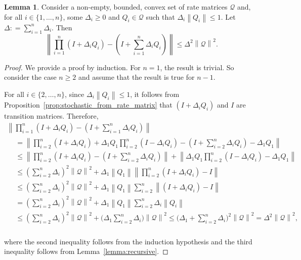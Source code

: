\documentclass[10pt,a4paper]{paper}
\theoremstyle{definition}
\newtheorem{lemma}[theorem]{Lemma}
\newcommand{\rateset}{\mathcal{Q}}
\newcommand{\norm}[1]{\left\lVert #1 \right\rVert}
\newcommand{\coloneqq}{:\!=}
\begin{document}
\begin{lemma}\label{lemma:convex_rate_set_contains_approximation}
Consider a non-empty, bounded, convex set of rate matrices $\rateset$ and, for all $i\in\{1,\ldots,n\}$, some $\Delta_i\geq0$ and $Q_i\in\rateset$ such that $\Delta_i\norm{Q_i}\leq1$. Let $\Delta\coloneqq\sum_{i=1}^n\Delta_i$. Then
\begin{equation*}
\norm{\prod_{i=1}^n(I+\Delta_iQ_i) - (I+\sum_{i=1}^n\Delta_iQ_i)} \leq \Delta^2\norm{\rateset}^2.
\end{equation*}
\end{lemma}
\begin{proof}
We provide a proof by induction. For $n=1$, the result is trivial. So consider the case $n\geq2$ and assume that the result is true for $n-1$. 

For all $i\in\{2,\dots,n\}$, since $\Delta_i\norm{Q_i}\leq 1$, it follows from Proposition~\ref{prop:stochastic_from_rate_matrix} that $(I+\Delta_iQ_i)$ and $I$ are transition matrices. Therefore,
\begin{multline*}
\norm{\prod_{i=1}^n(I+\Delta_iQ_i)-(I+\sum_{i=1}^n\Delta_iQ_i)}\\
\begin{aligned}
&=\norm{\prod_{i=2}^n(I+\Delta_iQ_i)+\Delta_1Q_1\prod_{i=2}^n(I-\Delta_iQ_i)-(I+\sum_{i=2}^n\Delta_iQ_i)-\Delta_1Q_1}\\
&\leq\norm{\prod_{i=2}^n(I+\Delta_iQ_i)-(I+\sum_{i=2}^n\Delta_iQ_i)}+\norm{\Delta_1Q_1\prod_{i=2}^n(I-\Delta_iQ_i)-\Delta_1Q_1}\\
&\leq(\sum_{i=2}^n\Delta_i)^2\norm{\rateset}^2
+\Delta_1\norm{Q_1}
\norm{\prod_{i=2}^n(I+\Delta_iQ_i)-I}\\
&\leq(\sum_{i=2}^n\Delta_i)^2\norm{\rateset}^2
+\Delta_1\norm{Q_1}
\sum_{i=2}^n
\norm{(I+\Delta_iQ_i)-I}\\
&=(\sum_{i=2}^n\Delta_i)^2\norm{\rateset}^2
+\Delta_1\norm{Q_1}
\sum_{i=2}^n
\Delta_i\norm{Q_i}\\
&\leq(\sum_{i=2}^n\Delta_i)^2\norm{\rateset}^2
+\Big(\Delta_1
\sum_{i=2}^n
\Delta_i\Big)\norm{\rateset}^2
\leq\Big(
\Delta_1+\sum_{i=2}^n\Delta_i
\Big)^2\norm{\rateset}^2
=\Delta^2\norm{\rateset}^2,
\end{aligned}
\end{multline*}\\[3pt]
where the second inequality follows from the induction hypothesis and the third inequality follows from Lemma~\ref{lemma:recursive}.
\end{proof}
\end{document}
